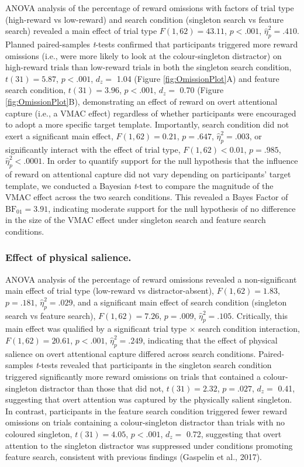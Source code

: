 \documentclass[man, a4paper, noextraspace, 11pt,floatsintext]{apa6}
\theoremstyle{definition}
\theoremstyle{definition}
\theoremstyle{definition}
\theoremstyle{remark}
\begin{document}
ANOVA analysis of the percentage of reward omissions with factors of
trial type (high-reward vs low-reward) and search condition (singleton
search vs feature search) revealed a main effect of trial type
\(F(1, 62) = 43.11\), \(p < .001\), \(\hat{\eta}^2_p = .410\). Planned
paired-samples \emph{t}-tests confirmed that participants triggered more
reward omissions (i.e., were more likely to look at the colour-singleton
distractor) on high-reward trials than low-reward trials in both the
singleton search condition, \(t(31) = 5.87\), \(p < .001\), \(d_z=\)
1.04 (Figure \ref{fig:OmissionPlot}A) and feature search condition,
\(t(31) = 3.96\), \(p < .001\), \(d_z=\) 0.70 (Figure
\ref{fig:OmissionPlot}B), demonstrating an effect of reward on overt
attentional capture (i.e., a VMAC effect) regardless of whether
participants were encouraged to adopt a more specific target template.
Importantly, search condition did not exert a significant main effect,
\(F(1, 62) = 0.21\), \(p = .647\), \(\hat{\eta}^2_p = .003\), or
significantly interact with the effect of trial type,
\(F(1,62) < 0.01\), \(p=.985\), \(\hat{\eta}^2_p < .0001\). In order to
quantify support for the null hypothesis that the influence of reward on
attentional capture did not vary depending on participants' target
template, we conducted a Bayesian \emph{t}-test to compare the magnitude
of the VMAC effect across the two search conditions. This revealed a
Bayes Factor of \(\mathrm{BF}_{\textrm{01}} = 3.91\), indicating
moderate support for the null hypothesis of no difference in the size of
the VMAC effect under singleton search and feature search conditions.

\subsubsection{Effect of physical
salience.}\label{effect-of-physical-salience.}

ANOVA analysis of the percentage of reward omissions revealed a
non-significant main effect of trial type (low-reward vs
distractor-absent), \(F(1, 62) = 1.83\), \(p = .181\),
\(\hat{\eta}^2_p = .029\), and a significant main effect of search
condition (singleton search vs feature search), \(F(1, 62) = 7.26\),
\(p = .009\), \(\hat{\eta}^2_p = .105\). Critically, this main effect
was qualified by a significant trial type \(\times\) search condition
interaction, \(F(1, 62) = 20.61\), \(p < .001\),
\(\hat{\eta}^2_p = .249\), indicating that the effect of physical
salience on overt attentional capture differed across search conditions.
Paired-samples \emph{t}-tests revealed that participants in the
singleton search condition triggered significantly more reward omissions
on trials that contained a colour-singleton distractor than those that
did not, \(t(31) = 2.32\), \(p = .027\), \(d_z=\) 0.41, suggesting that
overt attention was captured by the physically salient singleton. In
contrast, participants in the feature search condition triggered fewer
reward omissions on trials containing a colour-singleton distractor than
trials with no coloured singleton, \(t(31) = 4.05\), \(p < .001\),
\(d_z=\) 0.72, suggesting that overt attention to the singleton
distractor was suppressed under conditions promoting feature search,
consistent with previous findings (Gaspelin et al., 2017).
\end{document}
